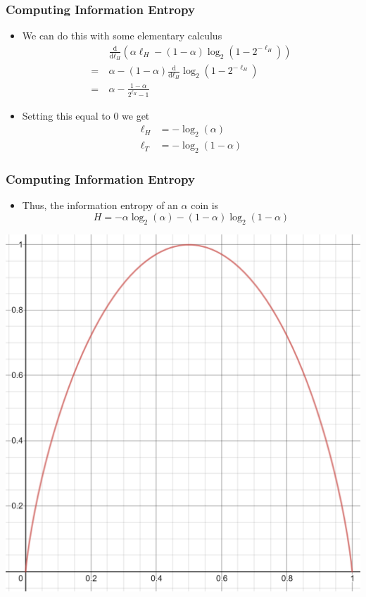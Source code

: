 \documentclass[xcolor=dvipsnames]{beamer}
\begin{document}
	\begin{frame}
	\frametitle{Computing Information Entropy}
    	\begin{itemize}
    	    \item We can do this with some elementary calculus \begin{align*}
    	         & \frac{\text{d}}{\text{d}\ell_H} \left( \alpha \ell_H - (1 - \alpha) \log_2\left( 1 - 2^{-\ell_H} \right) \right) \\ = \ & \alpha - (1 - \alpha) \frac{\text{d}}{\text{d}\ell_H} \log_2\left( 1- 2^{-\ell_H} \right) \\ = \ & \alpha - \frac{1 - \alpha}{2^{\ell_H} - 1}
    	    \end{align*}
    	    \pause
    	    \item Setting this equal to 0 we get\begin{align*}
    	        \ell_H &= -\log_2(\alpha) \\  \ell_T  &= -\log_2(1-\alpha)\end{align*} 
    	\end{itemize}
	\end{frame}
	
	\begin{frame}
	\frametitle{Computing Information Entropy}
	\begin{itemize}
	    \item Thus, the information entropy of an $\alpha$ coin is $$ \boxed{H = -\alpha \log_2(\alpha) - (1-\alpha) \log_2(1-\alpha)} $$
	    \pause
	\end{itemize}
    	\begin{center}
    	    \includegraphics[scale=.3]{ent.PNG}
    	\end{center}
	\end{frame}
	
\end{document}
